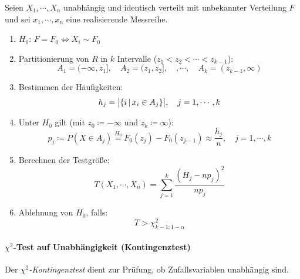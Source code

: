            Seien \( X_1, \cdots, X_n \) unabhängig und identisch verteilt mit unbekannter Verteilung \(F\) und sei \(x_1, \cdots, x_n\) eine realisierende Messreihe.
            \begin{enumerate}
            	\item \(H_0\): \quad \( F = F_0 \iff X_i \sim F_0 \)
            	\item Partitionierung von \(R\) in \(k\) Intervalle (\( z_1 < z_2 < \cdots < z_{k-1} \)):
                	\begin{equation*}
	                	A_1 = (-\infty, z_1], \quad A_2 = (z_1, z_2], \quad, \cdots, \quad A_k = (z_{k-1}, \infty)
                	\end{equation*}
                \item Bestimmen der Häufigkeiten:
	                \begin{equation*}
		                h_j = \big| \{ i \,\vert\, x_i \in A_j \} \big|, \quad j = 1, \cdots, k
	                \end{equation*}
	            \item Unter \( H_0 \) gilt (mit \( z_0 \coloneqq -\infty \) und \( z_k \coloneqq \infty \)):
		            \begin{equation*}
			            p_j \coloneqq P(X \in A_j) \overset{H_0}{=} F_0(z_j) - F_0(z_{j-1}) \approx \frac{h_j}{n}, \quad j = 1, \cdots, k
		            \end{equation*}
		        \item Berechnen der Testgröße:
			        \begin{equation*}
				        T(X_1, \cdots, X_n) = \sum_{j = 1}^{k} \frac{(H_j - n p_j)^2}{n p_j}
			        \end{equation*}
			    \item Ablehnung von \(H_0\), falls:
				    \begin{equation*}
					    T > \chi_{k - 1; 1 - \alpha}^2
				    \end{equation*}
            \end{enumerate}

        \paragraph{\(\chi^2\)-Test auf Unabhängigkeit (Kontingenztest)}
            Der \textit{\(\chi^2\)-Kontingenztest} dient zur Prüfung, ob Zufallsvariablen unabhängig sind.
            
